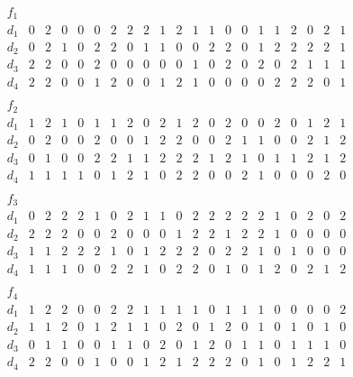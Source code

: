$$\begin{array}{c|cccccccccccccccccccc} 
f_1 &&&&&&&&&&&&&&&&&&&&\\ 
\hline 
d_1 & 0& 2& 0& 0& 0& 2& 2& 2& 1& 2& 1& 1& 0& 0& 1& 1& 2& 0& 2& 1\\ 
d_2 & 0& 2& 1& 0& 2& 2& 0& 1& 1& 0& 0& 2& 2& 0& 1& 2& 2& 2& 2& 1\\ 
d_3 & 2& 2& 0& 0& 2& 0& 0& 0& 0& 0& 1& 0& 2& 0& 2& 0& 2& 1& 1& 1\\ 
d_4 & 2& 2& 0& 0& 1& 2& 0& 0& 1& 2& 1& 0& 0& 0& 0& 2& 2& 2& 0& 1\\ 
\end{array}$$ 
$$\begin{array}{c|cccccccccccccccccccc} 
f_2 &&&&&&&&&&&&&&&&&&&&\\ 
\hline 
d_1 & 1& 2& 1& 0& 1& 1& 2& 0& 2& 1& 2& 0& 2& 0& 0& 2& 0& 1& 2& 1\\ 
d_2 & 0& 2& 0& 0& 2& 0& 0& 1& 2& 2& 0& 0& 2& 1& 1& 0& 0& 2& 1& 2\\ 
d_3 & 0& 1& 0& 0& 2& 2& 1& 1& 2& 2& 2& 1& 2& 1& 0& 1& 1& 2& 1& 2\\ 
d_4 & 1& 1& 1& 1& 0& 1& 2& 1& 0& 2& 2& 0& 0& 2& 1& 0& 0& 0& 2& 0\\ 
\end{array}$$ 
$$\begin{array}{c|cccccccccccccccccccc} 
f_3 &&&&&&&&&&&&&&&&&&&&\\ 
\hline 
d_1 & 0& 2& 2& 2& 1& 0& 2& 1& 1& 0& 2& 2& 2& 2& 2& 1& 0& 2& 0& 2\\ 
d_2 & 2& 2& 2& 0& 0& 2& 0& 0& 0& 1& 2& 2& 1& 2& 2& 1& 0& 0& 0& 0\\ 
d_3 & 1& 1& 2& 2& 2& 1& 0& 1& 2& 2& 2& 0& 2& 2& 1& 0& 1& 0& 0& 0\\ 
d_4 & 1& 1& 1& 0& 0& 2& 2& 1& 0& 2& 2& 0& 1& 0& 1& 2& 0& 2& 1& 2\\ 
\end{array}$$ 
$$\begin{array}{c|cccccccccccccccccccc} 
f_4 &&&&&&&&&&&&&&&&&&&&\\ 
\hline 
d_1 & 1& 2& 2& 0& 0& 2& 2& 1& 1& 1& 1& 0& 1& 1& 1& 0& 0& 0& 0& 2\\ 
d_2 & 1& 1& 2& 0& 1& 2& 1& 1& 0& 2& 0& 1& 2& 0& 1& 0& 1& 0& 1& 0\\ 
d_3 & 0& 1& 1& 0& 0& 1& 1& 0& 2& 0& 1& 2& 0& 1& 1& 0& 1& 1& 1& 0\\ 
d_4 & 2& 2& 0& 0& 1& 0& 0& 1& 2& 1& 2& 2& 2& 0& 1& 0& 1& 2& 2& 1\\ 
\end{array}$$ 
